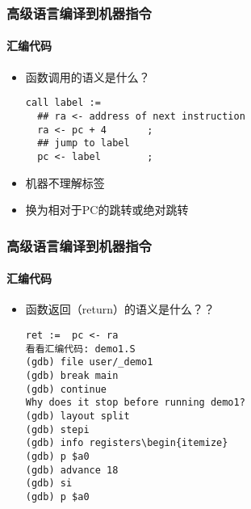 \begin{frame}[fragile]
\frametitle{高级语言编译到机器指令}
\framesubtitle{汇编代码}
	
\begin{itemize}
	
	\item 函数调用的语义是什么？	


\begin{lstlisting}
call label :=
  ## ra <- address of next instruction
  ra <- pc + 4       ;
  ## jump to label
  pc <- label        ; 
\end{lstlisting}
\item 机器不理解标签
\item 换为相对于PC的跳转或绝对跳转	
\end{itemize}

\end{frame}




\begin{frame}[fragile]
	\frametitle{高级语言编译到机器指令}
	\framesubtitle{汇编代码}
	
	\begin{itemize}
		
		\item 函数返回（return）的语义是什么？？	
		
		
		\begin{lstlisting}
ret :=  pc <- ra
看看汇编代码: demo1.S
(gdb) file user/_demo1
(gdb) break main
(gdb) continue
Why does it stop before running demo1?
(gdb) layout split
(gdb) stepi
(gdb) info registers\begin{itemize}
(gdb) p $a0
(gdb) advance 18
(gdb) si
(gdb) p $a0
\end{lstlisting}

	\end{itemize}
	
\end{frame}



